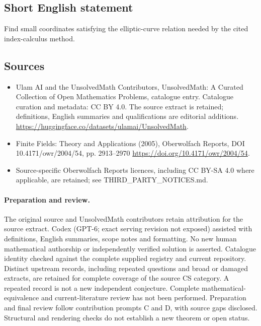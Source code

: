 \documentclass[11pt]{article}
\begin{document}
\subsection{Short English statement}
Find small coordinates satisfying the elliptic-curve relation needed by the cited index-calculus method.
\subsection{Sources}
\begin{itemize}
\item[\hypertarget{source:statement:1}{S1}] Ulam AI and the UnsolvedMath Contributors, UnsolvedMath: A Curated Collection of Open Mathematics Problems, catalogue entry. Catalogue curation and metadata: CC BY 4.0. The source extract is retained; definitions, English summaries and qualifications are editorial additions.
\url{https://huggingface.co/datasets/ulamai/UnsolvedMath}.
\item[\hypertarget{source:statement:2}{S2}] Finite Fields: Theory and Applications (2005), Oberwolfach Reports, DOI 10.4171/owr/2004/54, pp. 2913--2970
\url{https://doi.org/10.4171/owr/2004/54}.
\item Source-specific Oberwolfach Reports licences, including CC BY-SA 4.0 where applicable, are retained; see THIRD\_PARTY\_NOTICES.md.
\end{itemize}
\paragraph{Preparation and review.}
The original source and UnsolvedMath contributors retain attribution for the source extract. Codex (GPT-6; exact serving revision not exposed) assisted with definitions, English summaries, scope notes and formatting. No new human mathematical authorship or independently verified solution is asserted. Catalogue identity checked against the complete supplied registry and current repository. Distinct upstream records, including repeated questions and broad or damaged extracts, are retained for complete coverage of the source CS category. A repeated record is not a new independent conjecture. Complete mathematical-equivalence and current-literature review has not been performed. Preparation and final review follow contribution prompts C and D, with source gaps disclosed. Structural and rendering checks do not establish a new theorem or open status.
\label{end:statement}
\end{document}
